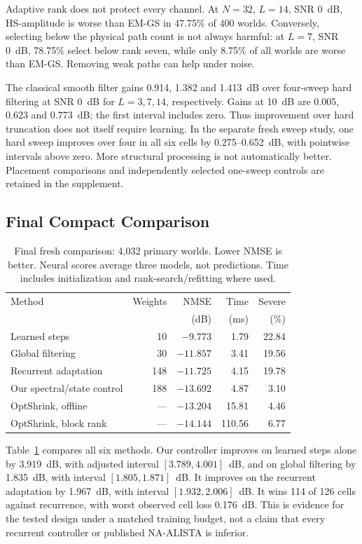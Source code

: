 \documentclass[10pt,journal,letterpaper]{IEEEtran}
\begin{document}
Adaptive rank does not protect every channel. At $N=32$, $L=14$, SNR 0~dB, HS-amplitude is worse than EM-GS in 47.75\% of 400 worlds. Conversely, selecting below the physical path count is not always harmful: at $L=7$, SNR 0~dB, 78.75\% select below rank seven, while only 8.75\% of all worlds are worse than EM-GS. Removing weak paths can help under noise.

The classical smooth filter gains 0.914, 1.382 and 1.413~dB over four-sweep hard filtering at SNR 0~dB for $L=3,7,14$, respectively. Gains at 10~dB are 0.005, 0.623 and 0.773~dB; the first interval includes zero. Thus improvement over hard truncation does not itself require learning. In the separate fresh sweep study, one hard sweep improves over four in all six cells by 0.275--0.652~dB, with pointwise intervals above zero. More structural processing is not automatically better. Placement comparisons and independently selected one-sweep controls are retained in the supplement.

\subsection{Final Compact Comparison}
\begin{table}[!t]
\caption{Final fresh comparison: 4,032 primary worlds. Lower NMSE is better. Neural scores average three models, not predictions. Time includes initialization and rank-search/refitting where used.}
\label{tab:compact}\centering\footnotesize\setlength{\tabcolsep}{3pt}
\begin{tabular}{@{}lrrrr@{}}\toprule
Method & Weights & NMSE & Time & Severe\\
 & & (dB) & (ms) & (\%)\\\midrule
Learned steps & 10 & $-9.773$ & 1.79 & 22.84\\
Global filtering & 30 & $-11.857$ & 3.41 & 19.56\\
Recurrent adaptation & 148 & $-11.725$ & 4.15 & 19.78\\
Our spectral/state control & 188 & $-13.692$ & 4.87 & 3.10\\
OptShrink, offline & --- & $-13.204$ & 15.81 & 4.46\\
OptShrink, block rank & --- & $-14.144$ & 110.56 & 6.77\\\bottomrule
\end{tabular}
\end{table}
Table~\ref{tab:compact} compares all six methods. Our controller improves on learned steps alone by 3.919~dB, with adjusted interval $[3.789,4.001]$~dB, and on global filtering by 1.835~dB, with interval $[1.805,1.871]$~dB. It improves on the recurrent adaptation by 1.967~dB, with interval $[1.932,2.006]$~dB. It wins 114 of 126 cells against recurrence, with worst observed cell loss 0.176~dB. This is evidence for the tested design under a matched training budget, not a claim that every recurrent controller or published NA-ALISTA is inferior.
\end{document}
